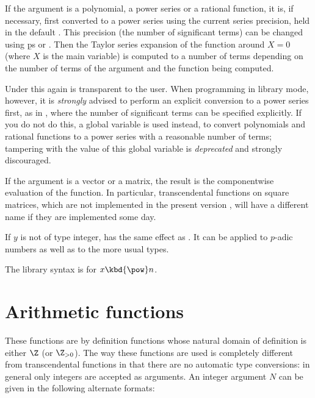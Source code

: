 \item If the argument is a polynomial, a power series or a rational function,
it is, if necessary, first converted to a power series using the current
series precision, held in the default . This precision
(the number of significant terms) can be changed using \b{ps} or
. Then the Taylor series expansion of the
function around $X=0$ (where $X$ is the main variable) is computed to a
number of terms depending on the number of terms of the argument and the
function being computed.

Under  this again is transparent to the user. When programming in
library mode, however, it is \emph{strongly} advised to perform an explicit
conversion to a power series first, as in ,
where the number of significant terms  can be specified
explicitly. If you do not do this, a global variable  is used
instead, to convert polynomials and rational functions to a power series with
a reasonable number of terms; tampering with the value of this global
variable is \emph{deprecated} and strongly discouraged.


\item If the argument is a vector or a matrix, the result is the
componentwise evaluation of the function. In particular, transcendental
functions on square matrices, which are not implemented in the present
version \vers, will have a different name if they are implemented some day.

\subseckbd{\pow} If $y$ is not of type integer,  has the same
effect as . It can be applied to $p$-adic numbers as well
as to the more usual types.

The library syntax is 
for $x\hbox{\kbd{\pow}}n$.


\section{Arithmetic functions}\label{se:arithmetic}

These functions are by definition functions whose natural domain of
definition is either $\Z$ (or $\Z_{>0}$). The way these functions are used is
completely different from transcendental functions in that there are no
automatic type conversions: in general only integers are accepted as
arguments. An integer argument $N$ can be given in the following alternate
formats:

